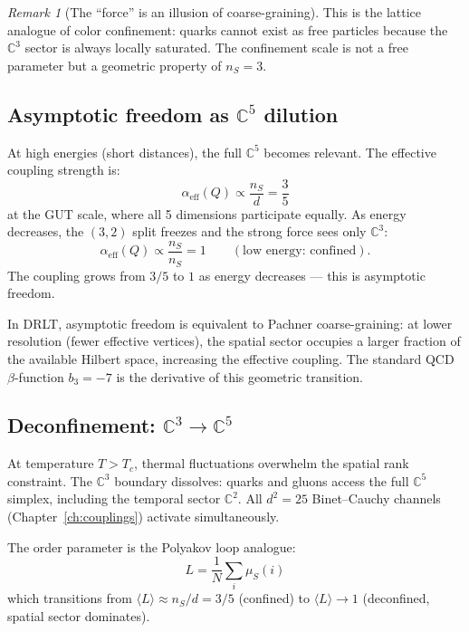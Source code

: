 \documentclass[12pt]{article}
\theoremstyle{remark}
\newtheorem{remark}[theorem]{Remark}
\theoremstyle{definition}
\newcommand{\CC}{\mathbb{C}}
\begin{document}
\begin{remark}[The ``force'' is an illusion of coarse-graining]
This is the lattice analogue of color confinement: quarks cannot exist as free particles because the $\CC^3$ sector is always locally saturated. The confinement scale is not a free parameter but a geometric property of $n_S = 3$.

\subsection{Asymptotic freedom as $\CC^5$ dilution}

At high energies (short distances), the full $\CC^5$ becomes relevant. The effective coupling strength is:
\begin{equation}
\alpha_\text{eff}(Q) \propto \frac{n_S}{d} = \frac{3}{5}
\end{equation}
at the GUT scale, where all 5 dimensions participate equally. As energy decreases, the $(3,2)$ split freezes and the strong force sees only $\CC^3$:
\begin{equation}
\alpha_\text{eff}(Q) \propto \frac{n_S}{n_S} = 1 \qquad (\text{low energy: confined}).
\end{equation}
The coupling grows from $3/5$ to $1$ as energy decreases --- this is asymptotic freedom.

In DRLT, asymptotic freedom is equivalent to Pachner coarse-graining: at lower resolution (fewer effective vertices), the spatial sector occupies a larger fraction of the available Hilbert space, increasing the effective coupling. The standard QCD $\beta$-function $b_3 = -7$ is the derivative of this geometric transition.

\subsection{Deconfinement: $\CC^3 \to \CC^5$}

At temperature $T > T_c$, thermal fluctuations overwhelm the spatial rank constraint. The $\CC^3$ boundary dissolves: quarks and gluons access the full $\CC^5$ simplex, including the temporal sector $\CC^2$. All $d^2 = 25$ Binet--Cauchy channels (Chapter~\ref{ch:couplings}) activate simultaneously.

The order parameter is the Polyakov loop analogue:
\begin{equation}
L = \frac{1}{N}\sum_i \mu_S(i)
\end{equation}
which transitions from $\langle L\rangle \approx n_S/d = 3/5$ (confined) to $\langle L\rangle \to 1$ (deconfined, spatial sector dominates).


\end{remark}
\end{document}
